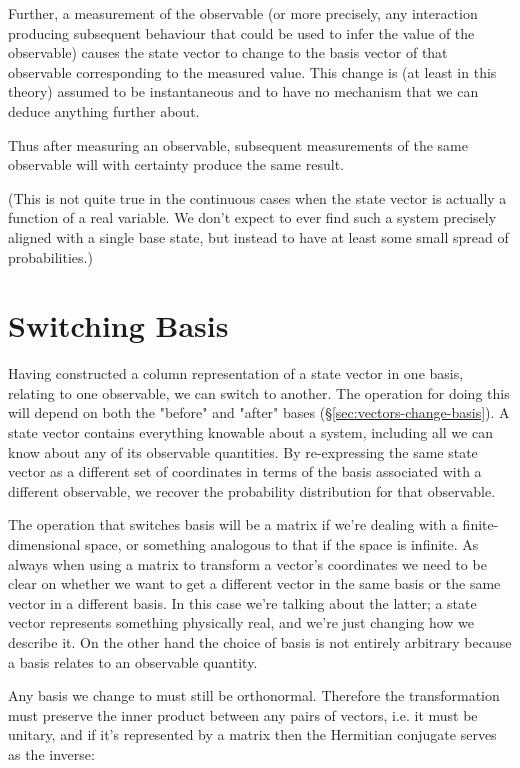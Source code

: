 Further, a measurement of the observable (or more precisely, any interaction producing subsequent behaviour that could be used to infer the value of the observable) causes the state vector to change to the basis vector of that observable corresponding to the measured value. This change is (at least in this theory) assumed to be instantaneous and to have no mechanism that we can deduce anything further about.

Thus after measuring an observable, subsequent measurements of the same observable will with certainty produce the same result.

(This is not quite true in the continuous cases when the state vector is actually a function of a real variable. We don't expect to ever find such a system precisely aligned with a single base state, but instead to have at least some small spread of probabilities.)

\section{Switching Basis}

Having constructed a column representation of a state vector in one basis, relating to one observable, we can switch to another. The operation for doing this will depend on both the "before" and "after" bases (§\ref{sec:vectors-change-basis}). A state vector contains everything knowable about a system, including all we can know about any of its observable quantities. By re-expressing the same state vector as a different set of coordinates in terms of the basis associated with a different observable, we recover the probability distribution for that observable.

The operation that switches basis will be a matrix if we're dealing with a finite-dimensional space, or something analogous to that if the space is infinite. As always when using a matrix to transform a vector's coordinates we need to be clear on whether we want to get a different vector in the same basis or the same vector in a different basis. In this case we're talking about the latter; a state vector represents something physically real, and we're just changing how we describe it. On the other hand the choice of basis is not entirely arbitrary because a basis relates to an observable quantity.

Any basis we change to must still be orthonormal. Therefore the transformation must preserve the inner product between any pairs of vectors, i.e. it must be unitary, and if it's represented by a matrix then the Hermitian conjugate serves as the inverse:

